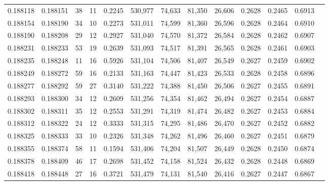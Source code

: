 \begin{tabular}{rrrrrrrrrrrrr}
0.188118 & 0.188151 &    38 &  11 &                                     0.2245 & 530,977 &  74,633 &  81,350 &  26,606 & 0.2628 & 0.2465 & 0.6913 \\
0.188154 & 0.188190 &    34 &  10 &                                     0.2273 & 531,011 &  74,599 &  81,360 &  26,596 & 0.2628 & 0.2464 & 0.6910 \\
0.188190 & 0.188208 &    29 &  12 &                                     0.2927 & 531,040 &  74,570 &  81,372 &  26,584 & 0.2628 & 0.2462 & 0.6907 \\
0.188231 & 0.188233 &    53 &  19 &                                     0.2639 & 531,093 &  74,517 &  81,391 &  26,565 & 0.2628 & 0.2461 & 0.6903 \\
0.188235 & 0.188248 &    11 &  16 &                                     0.5926 & 531,104 &  74,506 &  81,407 &  26,549 & 0.2627 & 0.2459 & 0.6902 \\
0.188249 & 0.188272 &    59 &  16 &                                     0.2133 & 531,163 &  74,447 &  81,423 &  26,533 & 0.2628 & 0.2458 & 0.6896 \\
0.188277 & 0.188292 &    59 &  27 &                                     0.3140 & 531,222 &  74,388 &  81,450 &  26,506 & 0.2627 & 0.2455 & 0.6891 \\
0.188293 & 0.188300 &    34 &  12 &                                     0.2609 & 531,256 &  74,354 &  81,462 &  26,494 & 0.2627 & 0.2454 & 0.6887 \\
0.188302 & 0.188311 &    35 &  12 &                                     0.2553 & 531,291 &  74,319 &  81,474 &  26,482 & 0.2627 & 0.2453 & 0.6884 \\
0.188312 & 0.188322 &    24 &  12 &                                     0.3333 & 531,315 &  74,295 &  81,486 &  26,470 & 0.2627 & 0.2452 & 0.6882 \\
0.188325 & 0.188333 &    33 &  10 &                                     0.2326 & 531,348 &  74,262 &  81,496 &  26,460 & 0.2627 & 0.2451 & 0.6879 \\
0.188355 & 0.188374 &    58 &  11 &                                     0.1594 & 531,406 &  74,204 &  81,507 &  26,449 & 0.2628 & 0.2450 & 0.6874 \\
0.188378 & 0.188409 &    46 &  17 &                                     0.2698 & 531,452 &  74,158 &  81,524 &  26,432 & 0.2628 & 0.2448 & 0.6869 \\
0.188418 & 0.188448 &    27 &  16 &                                     0.3721 & 531,479 &  74,131 &  81,540 &  26,416 & 0.2627 & 0.2447 & 0.6867 \\

\end{tabular}
